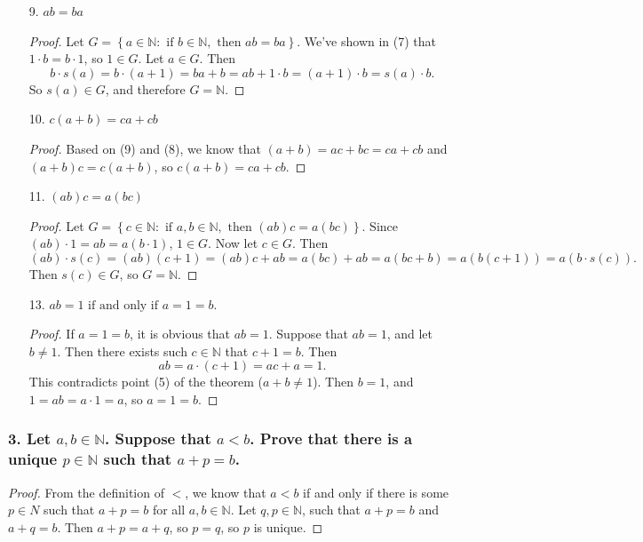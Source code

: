 \documentclass{article}
\newcommand{\N}{\mathbb{N}}
\begin{document}
\begin{enumerate}
\begin{proof}
		Let $c \in \N$. Then \[(a + b) \cdot s(c) = (a + b) \cdot c + (a + b) = ac + bc + a + b = (ac + a) + (bc + b) = a \cdot s(c) + b \cdot s(c).\] So $s(c) \in G$, and therefore $G = \N$.
	\end{proof}
	\item[9. ] $ab = ba$
	\begin{proof}
		Let $G = \left\{a \in \N: \text{ if } b \in \N, \text{ then }ab = ba\right\}$. We've shown in (7) that $1 \cdot b = b \cdot 1$, so $1 \in G$. Let $a \in G$. Then \[ b \cdot s(a) = b \cdot (a + 1) = ba + b = ab + 1 \cdot b = (a + 1) \cdot b = s(a) \cdot b. \] So $s(a) \in G$, and therefore $G = \N$.
	\end{proof}
	\item[10. ] $c(a + b) = ca + cb$
	\begin{proof}
		Based on (9) and (8), we know that $(a + b) = ac + bc = ca + cb$ and $(a + b)c = c(a + b)$, so $c(a + b) = ca + cb$.
	\end{proof}
	\item[11. ] $(ab)c = a(bc)$
	\begin{proof}
		Let $G = \left\{c \in \N: \text{ if } a,b \in \N, \text{ then } (ab)c = a(bc)\right\}$. Since $(ab)\cdot 1 = ab = a(b \cdot 1)$, $1 \in G$. Now let $c \in G$. Then \[ (ab)\cdot s(c) = (ab)(c + 1) = (ab)c + ab = a(bc) + ab = a(bc + b) = a(b(c + 1)) = a(b \cdot s(c)). \] Then $s(c) \in G$, so $G = \N$.
	\end{proof}
	\item[13. ] $ab = 1 \text{ if and only if } a = 1 = b$.
	\begin{proof}
		If $a = 1 = b$, it is obvious that $ab = 1$. Suppose that $ab = 1$, and let $b \ne 1$. Then there exists such $c \in \N$ that $c + 1 = b$. Then \[ab = a \cdot (c + 1) = ac + a = 1. \] This contradicts point (5) of the theorem ($a + b \ne 1$). Then $b = 1$, and $1 = ab = a \cdot 1 = a$, so $a = 1 = b$.
	\end{proof}
\end{enumerate}

\subsubsection*{3. Let $a, b \in \N$. Suppose that $a < b$. Prove that there is a unique $p \in \N$ such that $a + p = b$.}

\begin{proof}
	From the definition of $<$, we know that $a < b$ if and only if there is some $p \in N$ such that $a + p = b$ for all $a,b \in \N$.
	Let $q,p \in \N$, such that $a + p = b$ and $a + q = b$. Then $a + p = a + q$, so $p = q$, so $p$ is unique.
\end{proof}
\end{document}
